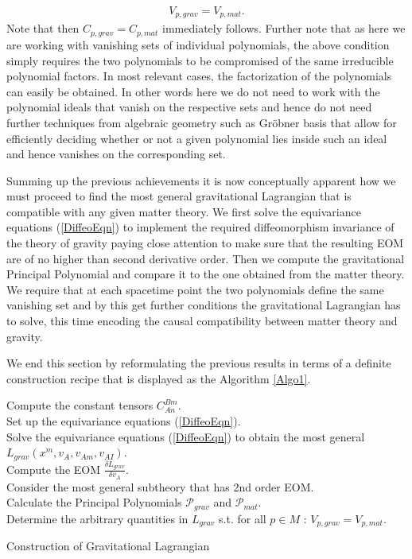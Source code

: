 \documentclass[a4paper,12pt, DIV=14, BCOR=5mm, twoside, headsepline, numbers=noenddot]{scrbook}
\begin{document}
\begin{align}
    V_{p,grav} = V_{p,mat}.
\end{align}
Note that then $C_{p,grav} = C_{p,mat}$ immediately follows. Further note that as here we are working with vanishing sets of individual polynomials, the above condition simply requires the two polynomials to be compromised of the same irreducible polynomial factors. In most relevant cases, the factorization of the polynomials can easily be obtained. In other words here we do not need to work with the polynomial ideals that vanish on the respective sets and hence do not need further techniques from algebraic geometry such as Gröbner basis that allow for efficiently deciding whether or not a given polynomial lies inside such an ideal and hence vanishes on the corresponding set.  

Summing up the previous achievements it is now conceptually apparent how we must proceed to find the most general gravitational Lagrangian that is compatible with any given matter theory. We first solve the equivariance equations (\ref{DiffeoEqn}) to implement the required diffeomorphism invariance of the theory of gravity paying close attention to make sure that the resulting EOM are of no higher than second derivative order. Then we compute the gravitational Principal Polynomial and compare it to the one obtained from the matter theory. We require that at each spacetime point the two polynomials define the same vanishing set and by this get further conditions the gravitational Lagrangian has to solve, this time encoding the causal compatibility between matter theory and gravity.

We end this section by reformulating the previous results in terms of a definite construction recipe that is displayed as the Algorithm \ref{Algo1}.
\begin{algorithm}[hbt!]
\SetAlgoLined
{}
Compute the constant tensors $C^{Bm}_{An}$. \\
Set up the equivariance equations (\ref{DiffeoEqn}). \\
Solve the equivariance equations (\ref{DiffeoEqn}) to obtain the most general $L_{grav}(x^m,v_A,v_{Am},v_{AI})$.\\
Compute the EOM $\frac{\delta L_{grav}}{\delta v_A}$.\\
Consider the most general subtheory that has 2nd order EOM.\\
Calculate the Principal Polynomials $\mathcal{P}_{grav}$ and $\mathcal{P}_{mat}$.\\
Determine the arbitrary quantities in $L_{grav}$ s.t. for all $p \in M$ : $V_{p,grav} = V_{p,mat}.$
 \caption{Construction of Gravitational Lagrangian}\label{Algo1}
\end{algorithm}
\end{document}
